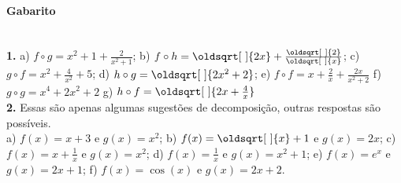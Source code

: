 \documentclass[a4paper,12pt]{article}
\renewcommand*{\sqrt}[2][\ ]{\oldsqrt[#1]{#2}}
\begin{document}
\vspace*{\fill}
{\footnotesize
\paragraph*{Gabarito} \hspace*{\fill}\\
\textbf{1.}   
a) $f \circ g  = x^{2} + 1 + \frac{2}{x^{2} + 1}$;
b) $f \circ h  = \sqrt{2x} + \frac{\sqrt{2}}{\sqrt{x}}$;
c) $g \circ f  = x^2 + \frac{4}{x^2} + 5 $;
d) $h \circ g  = \sqrt{2x^{2} + 2}$;
e) $f \circ f  =x + \frac{2}{x} + \frac{2x}{x^2+2}$
f) $g \circ g  = x^4 + 2x^2 + 2$
g) $h \circ f  = \sqrt{2 x + \frac{4}{x}}$\\
\textbf{2.} Essas são apenas algumas sugestões de decomposição, outras respostas são possíveis.\\
a) $f(x) = x + 3$ e $g(x) = x^2$;
b) $f(x) = \sqrt{x} + 1$ e $g(x) = 2x$;
c) $f(x) = x + \frac{1}{x}$ e $g(x) = x^2$;
d) $f(x) = \frac{1}{x}$ e $g(x) = x^2 + 1$;
e) $f(x) = e^x$ e $g(x) = 2x + 1$;
f) $f(x) = \cos(x)$ e $g(x) = 2x + 2$.
}
\end{document}
